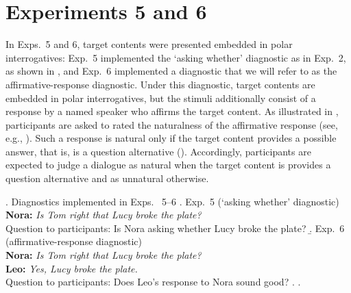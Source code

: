 \documentclass[times,linguex]{glossa}
\begin{document}
\section{Experiments 5 and 6 \label{sec:3_more-experiments}}

%

In Exps.~5 and 6, target contents were presented embedded in polar interrogatives: Exp.~5 implemented the `asking whether' diagnostic as in Exp.~2, as shown in \Next[a], and Exp.~6 implemented a diagnostic that we will refer to as the affirmative-response diagnostic. Under this diagnostic, target contents are embedded in polar interrogatives, but the stimuli additionally consist of a response by a named speaker who affirms the target content. As illustrated in \Next[b], participants are asked to rated the naturalness of the affirmative response (see, e.g., \citealt{amaral_review_2007,tonhauser_diagnosing_2012}). Such a response is natural only if the target content provides a possible answer, that is, is a question alternative (\citealt{von_stechow_focusing_1991}). Accordingly, participants are expected to judge a dialogue as natural when the target content is provides a question alternative and as unnatural otherwise.


\ex. Diagnostics implemented in Exps.~  5--6 
\a.\label{exp5} Exp.~5 (`asking whether' diagnostic)
\\ {\bf Nora:} \emph{Is Tom right that Lucy broke the plate?}
\\ Question to participants: Is Nora asking whether Lucy broke the plate?\smallskip
\b.\label{exp6} Exp.~6 (affirmative-response diagnostic)
\\ {\bf Nora:} \emph{Is Tom right that Lucy broke the plate?}
\\ {\bf Leo:} \emph{Yes, Lucy broke the plate.}
\\ Question to participants: Does Leo's response to Nora sound good?
\z. \z.
\end{document}
